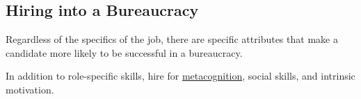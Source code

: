 \subsection{Hiring into a Bureaucracy}
Regardless of the specifics of the job, there are specific attributes that make a candidate more likely to be successful in a bureaucracy. 

In addition to role-specific skills, hire for \href{https://en.wikipedia.org/wiki/Metacognition}{metacognition}, social skills, and intrinsic motivation.



